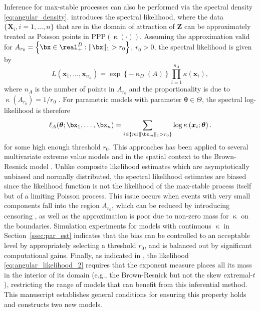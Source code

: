 \documentclass[12pt]{article}
\begin{document}
Inference for max-stable processes can also be performed via the spectral density \eqref{eq:angular_density}. \citet{Coles.Tawn:1991} introduces the spectral likelihood, where the data $\{\bm X_i,i=1,\dots,n\}$ that are in the domain of attraction of $\bm Z$ can be approximately treated as Poisson points in PPP$(\upkappa(\cdot))$. Assuming the approximation valid for $A_{r_0} = \left\{ \bx \in \real^D_+: \| \bx \|_1 > r_0\right\}$, $r_0>0$, the spectral likelihood is given by
%
\begin{equation}
\label{eq:angular_likelihood_1}
L(\bm x_1,\dots,\bm x_{n_{A}}) 
= \exp\left\{-\upkappa_D(A)\right\} \prod_{i=1}^{n_{A}}\kappa(\bm x_i), 
\end{equation}
%
where $n_A$ is the number of points in $A_{r_0}$ and the proportionality is due to $\upkappa(A_{r_0}) = 1/r_0$ \citep[see also][]{Coles.Tawn:1994}. For parametric models with parameter $\bm \theta \in \Theta$, the spectral log-likelihood is therefore
%
\begin{equation}
\label{eq:angular_likelihood_2}
\ell_A(\bm \theta;\bx_1,\dots,\bx_n) = 
\sum_{i \in \{m: \|\bx_m\|_1 > r_0\}} 
\log \kappa\left( \bm x_i;\bm \theta\right). 
\end{equation} 
%
for some high enough threshold $r_0$. This approaches has been applied to several multivariate extreme value models \citep[see, e.g.,][]{Cooley.etal:2010,Engelke.etal:2015, Beranger.Padoan:2015, Sabourin.etal2013} and in the spatial context to the Brown-Resnick model \citep{Engelke.etal:2015}.
%
Unlike composite likelihood estimates which are asymptotically unbiased and normally distributed, the spectral likelihood estimates are biased since the likelihood function is not the likelihood of the max-stable process itself but of a limiting Poisson process. This issue occurs when events with very small components fall into the region $A_{r_0}$, which can be reduced by introducing censoring \citep[see][]{Wadsworth.Tawn:2014, Thibaud.Opitz:2015}, as well as the approximation is poor due to non-zero mass for $\upkappa$ on the boundaries. Simulation experiments for models with continuous $\upkappa$ in Section~\ref{ssec:par_est} indicates that the bias can be controlled to an acceptable level by appropriately selecting a threshold $r_0$, and is balanced out by significant computational gains. Finally, as indicated in \citet{Thibaud.Opitz:2015}, the likelihood \eqref{eq:angular_likelihood_2} requires that the exponent measure places all its mass in the interior of its domain (e.g., the Brown-Resnick but not the skew extremal-$t$), restricting the range of models that can benefit from this inferential method. This manuscript establishes general conditions for ensuring this property holds and constructs two new models. 
\end{document}

